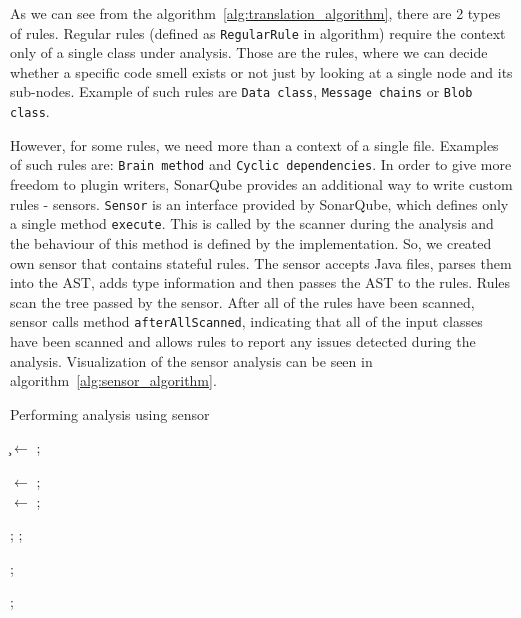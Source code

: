 As we can see from the algorithm~\ref{alg:translation_algorithm}, there are 2 types of rules.
Regular rules (defined as \verb|RegularRule| in algorithm) require the context only of a single class under analysis.
Those are the rules, where we can decide whether a specific code smell exists or not just by looking at a single node
and its sub-nodes.
Example of such rules are \verb|Data class|, \verb|Message chains| or \verb|Blob class|.

However, for some rules, we need more than a context of a single file.
Examples of such rules are: \verb|Brain method| and \verb|Cyclic dependencies|.
In order to give more freedom to plugin writers, SonarQube provides an additional way to write custom rules - sensors.
\verb|Sensor| is an interface provided by SonarQube, which defines only a single method \verb|execute|.
This is called by the scanner during the analysis and the behaviour of this method is defined by the implementation.
So, we created own sensor that contains stateful rules.
The sensor accepts Java files, parses them into the AST, adds type information and then passes the AST to the rules.
Rules scan the tree passed by the sensor.
After all of the rules have been scanned, sensor calls method \verb|afterAllScanned|, indicating that all of the
input classes have been scanned and allows rules to report any issues detected during the analysis.
Visualization of the sensor analysis can be seen in algorithm~\ref{alg:sensor_algorithm}.

\begin{algorithm} [!htb]
    \caption{Performing analysis using sensor}
    \label{alg:sensor_algorithm}
    \BlankLine

    \c$\leftarrow$ \CreateClassPath; \\

     {
        \AST$\leftarrow$ \ParseJavaFile { \j }; \\
        \AstWithSymbolicModel$\leftarrow$ \UpdateSymbolicModel{\j, \c};

         {
            \Scan{\r, \AstWithSymbolicModel};
        };
    }

     {
        \AfterAllScanned{};
    }

    \UploadResults{};
\end{algorithm}

